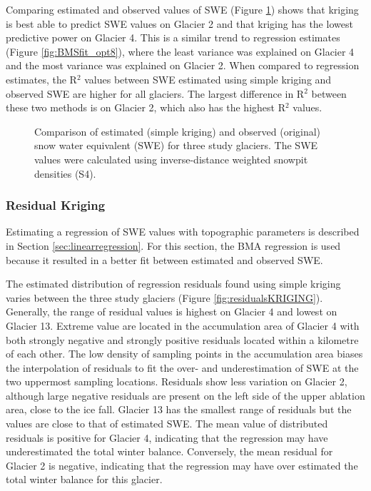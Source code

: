 \documentclass[12pt]{article}
\begin{document}
Comparing estimated and observed values of SWE (Figure \ref{fig:R2simplekrig}) shows that kriging is best able to predict SWE values on Glacier 2 and that kriging has the lowest predictive power on Glacier 4. This is a similar trend to regression estimates (Figure \ref{fig:BMSfit_opt8}), where the least variance was explained on Glacier 4 and the most variance was explained on Glacier 2. When compared to regression estimates, the R$^2$ values between SWE estimated using simple kriging and observed SWE are higher for all glaciers. The largest difference in R$^2$ between these two methods is on Glacier 2, which also has the highest R$^2$ values. 


\begin{figure}
	\caption{Comparison of estimated (simple kriging) and observed (original) snow water equivalent (SWE) for three study glaciers. The SWE values were calculated using inverse-distance weighted snowpit densities (S4).}
	\label{fig:R2simplekrig}
\end{figure}

\subsubsection{Residual Kriging}

Estimating a regression of SWE values with topographic parameters is described in Section \ref{sec:linearregression}. For this section, the BMA regression is used because it resulted in a better fit between estimated and observed SWE. 

The estimated distribution of regression residuals found using simple kriging varies between the three study glaciers (Figure \ref{fig:residualsKRIGING}). Generally, the range of residual values is highest on Glacier 4 and lowest on Glacier 13. Extreme value are located in the accumulation area of Glacier 4 with both strongly negative and strongly positive residuals located within a kilometre of each other. The low density of sampling points in the accumulation area biases the interpolation of residuals to fit the over- and underestimation of SWE at the two uppermost sampling locations. Residuals show less variation on Glacier 2, although large negative residuals are present on the left side of the upper ablation area, close to the ice fall. Glacier 13 has the smallest range of residuals but the values are close to that of estimated SWE. The mean value of distributed residuals is positive for Glacier 4, indicating that the regression may have underestimated the total winter balance. Conversely, the mean residual for Glacier 2 is negative, indicating that the regression may have over estimated the total winter balance for this glacier. 
\end{document}
